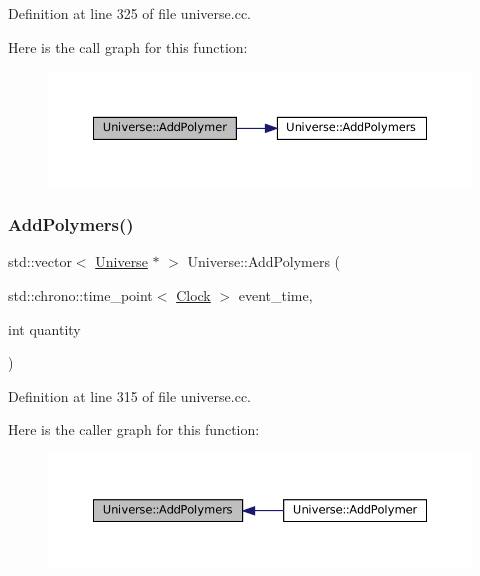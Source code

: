 Definition at line 325 of file universe.\+cc.

Here is the call graph for this function\+:\nopagebreak
\begin{figure}[H]
\begin{center}
\leavevmode
\includegraphics[width=350pt]{class_universe_a4ea0af5d2eb7b5070a83f7da29526fbd_cgraph}
\end{center}
\end{figure}
\mbox{\label{class_universe_aed7cb25507d516a2821ebb69d5345c54}} 
\subsubsection{\texorpdfstring{Add\+Polymers()}{AddPolymers()}}
{\footnotesize\ttfamily std\+::vector$<$ \mbox{\hyperlink{class_universe}{Universe}} $\ast$ $>$ Universe\+::\+Add\+Polymers (\begin{DoxyParamCaption}\item[{std\+::chrono\+::time\+\_\+point$<$ \mbox{\hyperlink{universe_8h_a0ef8d951d1ca5ab3cfaf7ab4c7a6fd80}{Clock}} $>$}]{event\+\_\+time,  }\item[{int}]{quantity }\end{DoxyParamCaption})}



Definition at line 315 of file universe.\+cc.

Here is the caller graph for this function\+:\nopagebreak
\begin{figure}[H]
\begin{center}
\leavevmode
\includegraphics[width=350pt]{class_universe_aed7cb25507d516a2821ebb69d5345c54_icgraph}
\end{center}
\end{figure}
\mbox{\label{class_universe_a598799e2fcdf9ed60e83e9f5a61bfc05}} 
